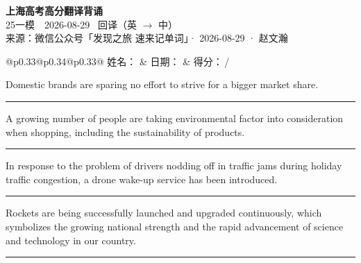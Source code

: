 \documentclass[11pt,a4paper]{article}
\newcommand{\num}[1]{\makebox[1.9em][r]{#1.}\hspace{0.3em}}
\newcommand{\wline}{\noindent\rule{\linewidth}{0.4pt}}
\begin{document}
\pagestyle{plain}
\begin{center}
{\LARGE\bfseries 上海高考高分翻译背诵 }\\[0.25em]
{\large 25一模　2026-08-29 \quad\ 回译（英 $\to$ 中）}\\[0.35em]
{\footnotesize 来源：微信公众号「发现之旅 速来记单词」· 2026-08-29 · 赵文瀚}
\end{center}

\vspace{0.4em}
\noindent\begin{tabular}{@{}p{0.33\textwidth}@{}p{0.34\textwidth}@{}p{0.33\textwidth}@{}}
姓名：\underline{\hspace{2.0cm}} & 日期：\underline{\hspace{2.0cm}} & 得分：\underline{\hspace{1.4cm}}\,/ \\
\end{tabular}

\vspace{0.5em}

\vspace{0.8em}
\num{1}Domestic brands are sparing no effort to strive for a bigger market share.

\vspace{0.25em}

\wline

\num{2}A growing number of people are taking environmental factor into consideration when shopping, including the sustainability of products.

\vspace{0.25em}

\wline

\num{3}In response to the problem of drivers nodding off in traffic jams during holiday traffic congestion, a drone wake-up service has been introduced.

\vspace{0.25em}

\wline

\num{4}Rockets are being successfully launched and upgraded continuously, which symbolizes the growing national strength and the rapid advancement of science and technology in our country.

\vspace{0.25em}

\wline
\end{document}
